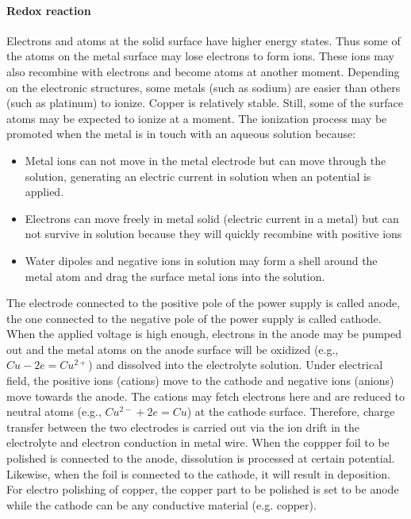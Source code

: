 \paragraph{Redox reaction}

Electrons and atoms at the solid surface have higher energy states. Thus some of the atoms on the metal surface may lose electrons to form ions. These ions may also recombine with electrons and become atoms at another moment. Depending on the electronic structures, some metals (such as sodium) are easier than others (such as platinum) to ionize. Copper is relatively stable. Still, some of the surface atoms may be expected to ionize at a moment. The ionization process may be promoted when the metal is in touch with an aqueous solution because: 
\begin{itemize}
	\item Metal ions can not move in the metal electrode but can move through the solution, generating an electric current in solution when an potential is applied.
	\item Electrons can move freely in metal solid (electric current in a metal) but can not survive in solution because they will quickly recombine with positive ions
	\item Water dipoles and negative ions in solution may form a shell around the metal atom and drag the surface metal ions into the solution.
\end{itemize}

The electrode connected to the positive pole of the power supply is called anode, the one connected to the negative pole of the power supply is called cathode. When the applied voltage is high enough, electrons in the anode may be pumped out and the metal atoms on the anode surface will be oxidized (e.g., $Cu - 2e = Cu^{2+}$) and dissolved into the electrolyte solution. Under electrical field, the positive ions (cations) move to the cathode and negative ions (anions) move towards the anode. The cations may fetch electrons here and are reduced to neutral atoms (e.g., $Cu^{2-} + 2e = Cu$) at the cathode surface. Therefore, charge transfer between the two electrodes is carried out via the ion drift in the electrolyte and electron conduction in metal wire. When the coppper foil to be polished is connected to the anode, dissolution is processed at certain potential. Likewise, when the foil is connected to the cathode, it will result in deposition. For electro polishing of copper, the copper part to be polished is set to be anode while the cathode can be any conductive material (e.g. copper).

